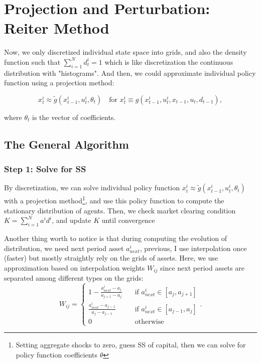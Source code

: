 \section{Projection and Perturbation: Reiter Method}

Now, we only {\color{red} discretized individual state space into grids}, and also the density function such that $\sum_{i=1}^{N} d^i_t = 1$ which is like discretization the continuous distribution with "histograms". And then, we could approximate individual policy function using a projection method:

\[ 
x^i_t \approx \tilde{g}(x^i_{t-1},u^i_t, \theta_t) \quad \text{for } x^i_t \equiv g(x^i_{t-1}, u^i_t, x_{t-1},u_t,d_{t-1}), 
\]

where $\theta_t$ is the vector of coefficients. 

\subsection{The General Algorithm}

\subsubsection*{Step 1: Solve for SS}

By discretization, we can solve individual policy function $x^i_t \approx \tilde{g}(x^i_{t-1},u^i_t, \theta_t)$ with a projection method\footnote{Setting aggregate shocks to zero, guess SS of capital, then we can solve for policy function coefficients $\theta$}, and use this policy function to compute the stationary distribution of agents. Then, we check market clearing condition $K=\sum_{i=1}^{N} a^i d^i$, and update $K$ until convergence

Another thing worth to notice is that during computing the evolution of distribution, we need next period asset $a^i_{next}$, previous, I use interpolation once (faster) but mostly straightly rely on the grids of assets. Here, we use approximation based on interpolation weights $W_{ij}$ since next period assets are separated among different types on the grids: 
\[
 W_{ij}=
 \begin{cases}
 1- \frac{a^i_{next} - a_j}{a_{j+1}-a_j} \quad &\text{if } a^i_{next} \in [a_j, a_{j+1}]\\ 
 \frac{a^i_{next} - a_{j-1}}{a_{j}-a_{j-1}} \quad &\text{if } a^i_{next} \in [a_{j-1}, a_{j}] \\
 0  \quad &\text{otherwise } 
 \end{cases}. 
\]

